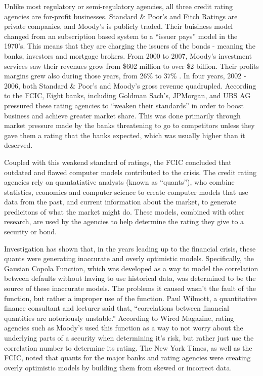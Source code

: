 \documentclass[11pt]{article}
\begin{document}
\begin{multicols}{2}
Unlike most regulatory or semi-regulatory agencies, all three credit rating agencies are for-profit businesses.  Standard \& Poor's and Fitch Ratings are private companies, and Moody's is publicly traded.  Their buisiness model changed from an subscription based system to a ``issuer pays'' model in the 1970's. \cite{CivilLiability, gatekeepers}  This means that they are charging the issuers of the bonds - meaning the banks, investors and mortgage brokers.  From 2000 to 2007, Moody's investment services saw their revenues grow from \$602 million to over \$2 billion. Their profits margins grew also during those years, from 26\% to 37\% \cite[p.149]{govtReport}.  In four years, 2002 - 2006, both Standard \& Poor's and Moody's gross revenue quadrupled.  According to the FCIC, Eight banks, including Goldman Sach's, JPMorgan, and UBS AG pressured these rating agencies to ``weaken their standards'' in order to boost business and achieve greater market share. \cite{ratingEthics} This was done primarily through market pressure made by the banks threatening to go to competitors unless they gave them a rating that the banks expected, which was usually higher than it deserved.  

Coupled with this weakend standard of ratings, the FCIC concluded that outdated and flawed computer models contributed to the crisis. \cite[p.~xxv]{govtReport} The credit rating agencies rely on quantatiative analysts (known as ``quants''), who combine statistics, economics and computer science to create computer models that use data from the past, and current information about the market, to generate predicitons of what the market might do. \cite{quantsRole} These models, combined with other research, are used by the agencies to help determine the rating they give to a security or bond.

Investigation has shown that, in the years leading up to the financial crisis, these quants were generating inaccurate and overly optimistic models. Specifically, the Gausian Copola Function, which was developed as a way to model the correlation between defaults without having to use historical data, was determined to be the source of these inaccurate models. \cite{wiredFormula} The problems it caused wasn't the fault of the function, but rather a improper use of the function.  Paul Wilmott, a quantitative finance consultant and lecturer said that, ``correlations between financial quantities are notoriously unstable.'' \cite{wiredFormula} According to Wired Magazine, rating agencies such as Moody's used this function as a way to not worry about the underlying parts of a security when determining it's risk, but rather just use the correlation number to determine its rating.  The New York Times, as well as the FCIC, noted that quants for the major banks and rating agencies were creating overly optimistic models by building them from skewed or incorrect data. \cite{nyTimesQuants, govtReport}


\end{multicols}
\end{document}
